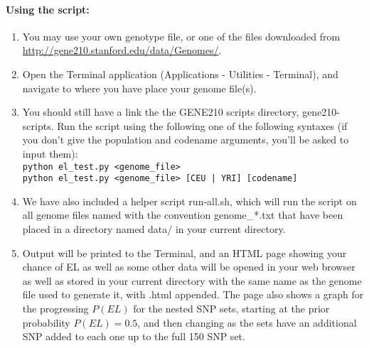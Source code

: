 \documentclass[a4paper, 12pt]{article}
\begin{document}
\paragraph{Using the script:}
\begin{enumerate}
  \item You may use your own genotype file, or one of the files downloaded from \url{http://gene210.stanford.edu/data/Genomes/}.
  \item Open the Terminal application (Applications - Utilities - Terminal), and navigate to where you have place your genome file(s).
  \item You should still have a link the the GENE210 scripts directory, gene210-scripts. 
    Run the script using the following one of the following syntaxes (if you don't give the population and codename arguments, you'll be asked to input them): \\
    \texttt{python el\_test.py <genome\_file>} \\
    \texttt{python el\_test.py <genome\_file> [CEU | YRI] [codename]}

  \item We have also included a helper script run-all.sh, which will run the script on all genome files named with the convention genome\_*.txt that have been placed in a directory named data/ in your current directory.
  
  \item Output will be printed to the Terminal, and an HTML page showing your chance of EL as well as some other data will be opened in your web browser as well as stored in your current directory with the same name as the genome file used to generate it, with .html appended. 
    The page also shows a graph for the progressing $P(EL)$ for the nested SNP sets, starting at the prior probability $P(EL) = 0.5$, and then changing as the sets have an additional SNP added to each one up to the full 150 SNP set.

\end{enumerate}
\end{document}
